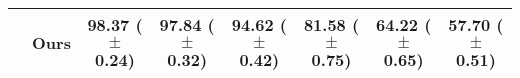 \begin{table*}[t]
{\begin{tabular}{l l c c c c c c}
     & Ours & {\bf 98.37} {\scriptsize ($\pm$ 0.24)} & {\bf 97.84} {\scriptsize ($\pm$ 0.32)} & {\bf 94.62} {\scriptsize ($\pm$ 0.42)} & {\bf 81.58} {\scriptsize ($\pm$ 0.75)} & {\bf 64.22} {\scriptsize ($\pm$ 0.65)} & {\bf 57.70} {\scriptsize ($\pm$ 0.51)} \\
    \bottomrule
\end{tabular}
}
\vspace{-3mm}
\label{tab:results_memory_selection_methods}
\end{table*}

\begin{comment}
\begin{table*}[t]
\footnotesize
\centering
\caption{
Performance comparison between RS-MCTS (Ours), Random scheduling (Random), Equal Task Schedule (ETS), and Heuristic Scheduling (Heuristic) with various memory selection methods evaluated across all datasets. 
The replay memory size is $M=10$ and $M=100$ for the 5-task and 10/20-task datasets respectively. We report the mean and standard deviation averaged over 5 seeds. RS-MCTS performs better or on par than the baselines on most datasets and selection methods, where MoF yields the best results %
in general.
}
\scalebox{0.87}{
\begin{tabular}{l l c c c c c c}
    \toprule
     & & \multicolumn{3}{c}{{\bf 5-task Datasets}} & \multicolumn{3}{c}{{\bf 10- and 20-task Datasets}} \\
    \cmidrule(lr){3-5} \cmidrule(lr){6-8}
    {\bf Selection} & {\bf Method} & S-MNIST & S-FashionMNIST & S-notMNIST & P-MNIST & S-CIFAR-100 & S-miniImagenet \\
    \midrule 
    \multirow{4}{*}{Uniform} & Random & 95.91 {\scriptsize ($\pm$ 1.56)}  & 95.82 {\scriptsize ($\pm$ 1.45)} & 92.39 {\scriptsize ($\pm$ 1.29)} & 72.44 {\scriptsize ($\pm$ 1.15)} & 53.99 {\scriptsize ($\pm$ 0.51)} & 48.08 {\scriptsize ($\pm$ 1.36)} \\
     & ETS  & 94.02 {\scriptsize ($\pm$ 4.25)} &  95.81 {\scriptsize ($\pm$ 3.53)} & 91.01 {\scriptsize ($\pm$ 1.39)} & 71.09 {\scriptsize ($\pm$ 2.31)} & 47.70 {\scriptsize ($\pm$ 2.16)} & 46.97 {\scriptsize ($\pm$ 1.24)} \\
     & Heuristic &  96.02 {\scriptsize ($\pm$ 2.32)} &  97.09 {\scriptsize ($\pm$ 0.62)} & 91.26 {\scriptsize ($\pm$ 3.99)} & 76.68 {\scriptsize ($\pm$ 2.13)} & 57.31 {\scriptsize ($\pm$ 1.21)} & 49.66 {\scriptsize ($\pm$ 1.10)} \\

\end{comment}
